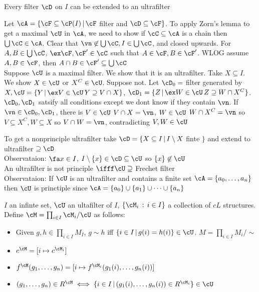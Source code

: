 \begin{theorem}
    Every filter $\cD$ on $I$ can be extended to an ultrafilter
\end{theorem}

\begin{pf}
    Let $\cA = \{ \cF \subseteq \cP(I) \, | \, \cF$ filter and $\cD \subseteq \cF\}$. To apply Zorn's lemma to get a maximal $\cU$ in $\cA$, we need to show if $\cC \subseteq \cA$ is a chain then $\bigcup \cC \in \cA$. Clear that $\vn \not \in \bigcup \cC, I \in \bigcup \cC$, and closed upwards. For $A, B \in \bigcup \cC$, $\ex \cF, \cF' \in \cC$ such that $A \in \cF, B \in \cF'$. WLOG assume $A, B \in \cF$, then $A \cap B \in \cF' \subseteq \bigcup \cC$ \\
    Suppose $\cU$ is a maximal filter. We show that it is an ultrafilter. Take $X \subseteq I$. We show $X \in \cU$ or $X^C \in \cU$. Suppose not. Let $\cD_0 =$ filter generated by $X, \cU = \{Y \, | \, \ex V \in \cU \, Y \supseteq V \cap X\}$, $\cD_1  =\{Z \, | \, \ex W \in \cU \, Z \supseteq W \cap X^C\}$. $\cD_0, \cD_1$ satsify all conditions except we dont know if they contain $\vn$. If $\vn \in \cD_0, \cD_1$, there is $V \in \cU$ $V \cap X = \vn$, $W \in \cU$ $W \cap X^C = \vn$ so $V \subseteq X^C, W \subseteq X$ so $V \cap W = \vn$, contradicting $V, W \in \cU$ 
\end{pf}

\noindent
To get a nonprinciple ultrafilter take $\cD = \{X \subseteq I \, | \, I \setminus X$ finte $\}$ and extend to ultrafilter $\supseteq \cD$ \\
Observataion: $\fa x \in I$, $I \setminus \{x\} \in \cD \subseteq \cU$ so $\{x\} \not\in \cU$ \\
An ultrafilter is not principle $\ifff \cU \supseteq $ Frechet filter \\
Observataion: If $\cU$ is an ultrafilter and contains a finite set $\cA = \{a_0, \ldots, a_n\}$ then $\cU$ is princtiple since $\cA = \{a_0\} \cup \{a_1\} \cup \cdots \cup \{a_n\}$ 

\begin{definition}[Ultraproduct]
    $I$ an infinte set, $\cU$ an ultafilter of $I$, $\{\cM_i \, : \, i \in I\}$ a collection of $cL$ structures. Define $\cM = \prod_{i \in I} \cM_i /\cU$ as follows: 
    \begin{itemize}
        \item Given $g, h \in \prod_{i \in I}M_I$, $g \sim h$ iff $\{i \in I \, | \, g(i) = h(i)\} \in \cU$. $M = \prod_{i \in I}M_i/\sim$ 
        \item $c^{\cM} = [ i \mapsto c^{\cM_i}]$ 
        \item $f^{\cM}(g_1, \ldots, g_n) = [i \mapsto f^{\cM_i}(g_1(i), \ldots, g_n(i))]$
        \item $(g_1, \ldots, g_n) \in R^{\cM} \iff \{i \in I \, | \, (g_1(i), \ldots, g_n(i)) \in R^{\cM_i}\} \in \cU$ 
    \end{itemize}
\end{definition}

